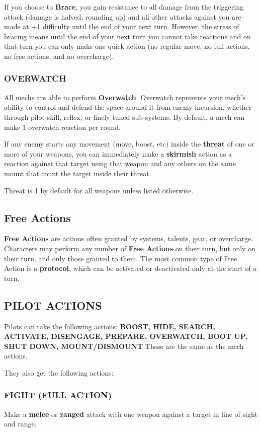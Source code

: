 If you choose to \textbf{Brace}, you gain resistance to all damage from the triggering attack (damage is halved, rounding up) and all other attacks against you are made at +1 difficulty until the end of your next turn. However, the stress of bracing means until the end of your next turn you cannot take reactions and on that turn you can only make one quick action (no regular move, no full actions, no free actions, and no overcharge).

\subsubsection{OVERWATCH}
All mechs are able to perform \textbf{Overwatch}. Overwatch represents your mech’s ability to control and defend the space around it from enemy incursion, whether through pilot skill, reflex, or finely tuned sub-systems. By default, a mech can make 1 overwatch reaction per round.

If any enemy starts any movement (move, boost, etc) inside the \textbf{threat} of one or more of your weapons, you can immediately make a \textbf{skirmish} action as a reaction against that target using that weapon and any others on the same mount that count the target inside their threat.

Threat is 1 by default for all weapons unless listed otherwise.

\subsection{Free Actions}
\textbf{Free Actions} are actions often granted by systems, talents, gear, or overcharge. Characters may perform any number of \textbf{Free Actions} on their turn, but only on their turn, and only those granted to them. The most common type of Free Action is a \textbf{protocol}, which can be activated or deactivated only at the start of a turn.

\subsection{PILOT ACTIONS}
Pilots can take the following actions: \textbf{BOOST, HIDE, SEARCH, ACTIVATE, DISENGAGE,  PREPARE, OVERWATCH, BOOT UP, SHUT DOWN, MOUNT/DISMOUNT}
These are the same as the mech actions.

They also get the following actions:

\subsubsection{FIGHT (FULL ACTION)}
Make a \textbf{melee} or \textbf{ranged} attack with one weapon against a target in line of sight and range.

